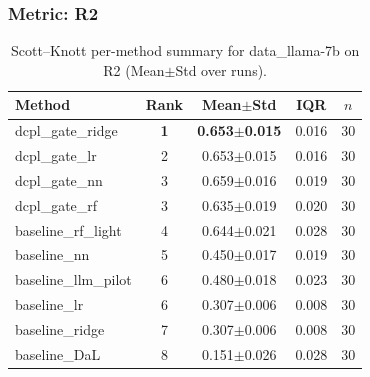 \subsubsection*{Metric: R2}
\begin{table}[H]
\centering
\scriptsize
\setlength{\tabcolsep}{4pt}
\renewcommand{\arraystretch}{1.1}
\caption{Scott--Knott per-method summary for data\_llama-7b on R2 (Mean$\pm$Std over runs).}
\label{tab:sk_data_llama-7b_R2}
\begin{tabular}{l|c|c|c|c}
\hline
\textbf{Method} & \textbf{Rank} & \textbf{Mean$\pm$Std} & \textbf{IQR} & \textbf{$n$} \\
\hline
\rowcolor{red!15} dcpl\_gate\_ridge & \textbf{1} & \textbf{0.653$\pm$0.015} & 0.016 & 30 \\
dcpl\_gate\_lr & 2 & 0.653$\pm$0.015 & 0.016 & 30 \\
dcpl\_gate\_nn & 3 & 0.659$\pm$0.016 & 0.019 & 30 \\
dcpl\_gate\_rf & 3 & 0.635$\pm$0.019 & 0.020 & 30 \\
baseline\_rf\_light & 4 & 0.644$\pm$0.021 & 0.028 & 30 \\
baseline\_nn & 5 & 0.450$\pm$0.017 & 0.019 & 30 \\
baseline\_llm\_pilot & 6 & 0.480$\pm$0.018 & 0.023 & 30 \\
baseline\_lr & 6 & 0.307$\pm$0.006 & 0.008 & 30 \\
baseline\_ridge & 7 & 0.307$\pm$0.006 & 0.008 & 30 \\
baseline\_DaL & 8 & 0.151$\pm$0.026 & 0.028 & 30 \\
\hline
\end{tabular}
\end{table}

